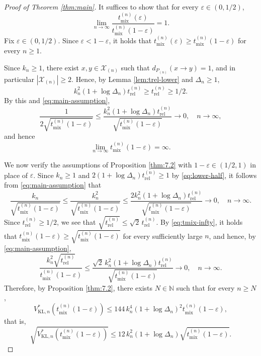 \documentclass[a4paper, reqno, 11pt]{amsart}
\theoremstyle{definition}
\begin{document}
\begin{proof}[Proof of Theorem \ref{thm:main}]
It suffices to show that for every $\varepsilon \in \left(0,1/2\right)$,
\begin{equation}\label{eq:cutoff-goal}
\lim_{n\to\infty}\frac{t_{\mathrm{mix}}^{(n)}(\varepsilon)}{t_{\mathrm{mix}}^{(n)}(1-\varepsilon)}=1.
\end{equation}
Fix $\varepsilon \in \left(0,1/2\right)$.
Since $\varepsilon < 1-\varepsilon$, it holds that
$t_{\mathrm{mix}}^{(n)}(\varepsilon) \ge t_{\mathrm{mix}}^{(n)}(1-\varepsilon)$ for every $n \ge 1$.

Since $k_n \ge 1$, there exist $x, y \in \mathcal{X}_{(n)}$ such that $d_{P_{(n)}}(x \to y) = 1$,
and in particular $|\mathcal{X}_{(n)}| \ge 2$.
Hence, by Lemma \ref{lem:trel-lower} and $\Delta_n \ge 1$,
\begin{equation}\label{eq:lower-half}
k_n^{2}\left(1+\log \Delta_n\right) t_{\mathrm{rel}}^{(n)} \ge t_{\mathrm{rel}}^{(n)} \ge 1/2.
\end{equation}
By this and \eqref{eq:main-assumption},
\[ \frac{1}{2\sqrt{t_{\mathrm{mix}}^{(n)}(1-\varepsilon)}} \le \frac{k_n^{2}\left(1+\log \Delta_n\right) t_{\mathrm{rel}}^{(n)}}{\sqrt{t_{\mathrm{mix}}^{(n)}(1-\varepsilon)}} \to 0, \quad n \to \infty, \]
and hence
\begin{equation}\label{eq:tmix-infty}
\lim_{n\to\infty} t_{\mathrm{mix}}^{(n)}(1-\varepsilon) = \infty.
\end{equation}

We now verify the assumptions of Proposition \ref{thm:7.2} with $1-\varepsilon \in \left(1/2,1\right)$ in place of $\varepsilon$.
Since $k_n \ge 1$ and $2\left(1+\log \Delta_n\right) t_{\mathrm{rel}}^{(n)} \ge 1$ by \eqref{eq:lower-half}, it follows from \eqref{eq:main-assumption} that
\[ \frac{k_n}{\sqrt{t_{\mathrm{mix}}^{(n)}(1-\varepsilon)}} \le \frac{k_n^{2}}{\sqrt{t_{\mathrm{mix}}^{(n)}(1-\varepsilon)}} \le \frac{2k_n^{2}\left(1+\log \Delta_n\right) t_{\mathrm{rel}}^{(n)}}{\sqrt{t_{\mathrm{mix}}^{(n)}(1-\varepsilon)}} \to 0, \quad n \to \infty. \]
Since $t_{\mathrm{rel}}^{(n)} \ge 1/2$, we see that $\sqrt{t_{\mathrm{rel}}^{(n)}} \le \sqrt{2}\,t_{\mathrm{rel}}^{(n)}$.
By \eqref{eq:tmix-infty}, it holds that $t_{\mathrm{mix}}^{(n)}(1-\varepsilon) \ge \sqrt{t_{\mathrm{mix}}^{(n)}(1-\varepsilon)}$ for every sufficiently large $n$, and hence, by \eqref{eq:main-assumption},
\[ \frac{k_n^{2}\sqrt{t_{\mathrm{rel}}^{(n)}}}{t_{\mathrm{mix}}^{(n)}(1-\varepsilon)} \le \frac{\sqrt{2}\,k_n^{2}\left(1+\log \Delta_n\right) t_{\mathrm{rel}}^{(n)}}{\sqrt{t_{\mathrm{mix}}^{(n)}(1-\varepsilon)}} \to 0, \quad n \to \infty. \]
Therefore, by Proposition \ref{thm:7.2}, there exists $N \in \mathbb{N}$ such that for every $n \ge N$,
\[ V_{\mathrm{KL},n}^{*}\!\left(t_{\mathrm{mix}}^{(n)}(1-\varepsilon)\right) \le 144\,k_n^{4}\left(1+\log \Delta_n\right)^{2} t_{\mathrm{mix}}^{(n)}(1-\varepsilon), \]
that is,
\[ \sqrt{V_{\mathrm{KL},n}^{*}\!\left(t_{\mathrm{mix}}^{(n)}(1-\varepsilon)\right)} \le 12\,k_n^{2}\left(1+\log \Delta_n\right)\sqrt{t_{\mathrm{mix}}^{(n)}(1-\varepsilon)}. \]


\end{proof}
\end{document}

